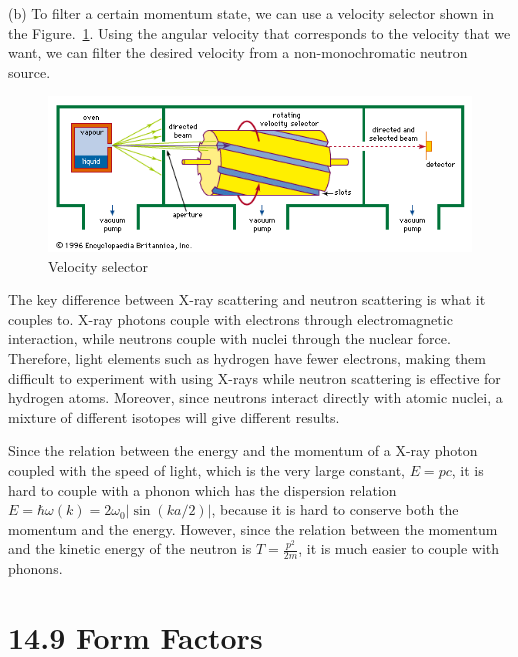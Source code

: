 \documentclass[a4paper,11pt]{article}
\begin{document}
(b)
To filter a certain momentum state, we can use a velocity selector shown in the Figure.~\ref{fig:velocity-selector}.  Using the angular velocity that corresponds to the velocity that we want, we can filter the desired velocity from a non-monochromatic neutron source.
\begin{figure}
    \centering
    \includegraphics[width=0.5\linewidth]{HW3/velocity-selector.png}
    \caption{Velocity selector}
    \label{fig:velocity-selector}
\end{figure}


The key difference between X-ray scattering and neutron scattering is what it couples to. X-ray photons couple with electrons through electromagnetic interaction, while neutrons couple with nuclei through the nuclear force. Therefore, light elements such as hydrogen have fewer electrons, making them difficult to experiment with using X-rays while neutron scattering is effective for hydrogen atoms. Moreover, since neutrons interact directly with atomic nuclei, a mixture of different isotopes will give different results.

Since the relation between the energy and the momentum of a X-ray photon coupled with the speed of light, which is the very large constant, $E=pc$, it is hard to couple with a phonon which has the dispersion relation $E=\hbar\omega(k)=2\omega_0|\sin(ka/2)|$, because it is hard to conserve both the momentum and the energy. However, since the relation between the momentum and the kinetic energy of the neutron is $T=\frac{p^2}{2m}$, it is much easier to couple with phonons.


\section{14.9 Form Factors}
\end{document}
